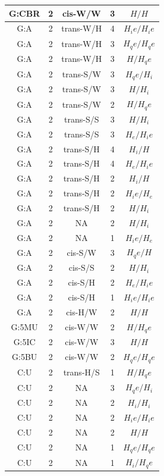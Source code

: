 \begin{center}
\begin{longtable}{c|c|c|c|c}
G:CBR & 2 & cis-W/W & 3 & $H/H$ \\  \hline
G:A & 2 & trans-W/H & 4 & $H_ie/H_ie$ \\  \hline
G:A & 2 & trans-W/H & 3 & $H_qe/H_qe$ \\  \hline
G:A & 2 & trans-W/H & 3 & $H/H_qe$ \\  \hline
G:A & 2 & trans-S/W & 3 & $H_qe/H_i$ \\  \hline
G:A & 2 & trans-S/W & 3 & $H/H_i$ \\  \hline
G:A & 2 & trans-S/W & 2 & $H/H_qe$ \\  \hline
G:A & 2 & trans-S/S & 3 & $H/H_i$ \\  \hline
G:A & 2 & trans-S/S & 3 & $H_e/H_ie$ \\  \hline
G:A & 2 & trans-S/H & 4 & $H_i/H$ \\  \hline
G:A & 2 & trans-S/H & 4 & $H_e/H_ie$ \\  \hline
G:A & 2 & trans-S/H & 2 & $H_i/H$ \\  \hline
G:A & 2 & trans-S/H & 2 & $H_ie/H_e$ \\  \hline
G:A & 2 & trans-S/H & 2 & $H/H_i$ \\  \hline
G:A & 2 & NA & 2 & $H/H_i$ \\  \hline
G:A & 2 & NA & 1 & $H_ie/H_e$ \\  \hline
G:A & 2 & cis-S/W & 3 & $H_qe/H$ \\  \hline
G:A & 2 & cis-S/S & 2 & $H/H_i$ \\  \hline
G:A & 2 & cis-S/H & 2 & $H_e/H_ie$ \\  \hline
G:A & 2 & cis-S/H & 1 & $H_ie/H_ie$ \\  \hline
G:A & 2 & cis-H/W & 2 & $H/H$ \\  \hline
G:5MU & 2 & cis-W/W & 2 & $H/H_qe$ \\  \hline
G:5IC & 2 & cis-W/W & 3 & $H/H$ \\  \hline
G:5BU & 2 & cis-W/W & 2 & $H_qe/H_qe$ \\  \hline
C:U & 2 & trans-H/S & 1 & $H/H_qe$ \\  \hline
C:U & 2 & NA & 3 & $H_qe/H_i$ \\  \hline
C:U & 2 & NA & 2 & $H_i/H_i$ \\  \hline
C:U & 2 & NA & 2 & $H_ie/H_ie$ \\  \hline
C:U & 2 & NA & 2 & $H/H$ \\  \hline
C:U & 2 & NA & 1 & $H_qe/H_qe$ \\  \hline
C:U & 2 & NA & 1 & $H_i/H_qe$ \\  \hline

\end{longtable}
\end{center}

